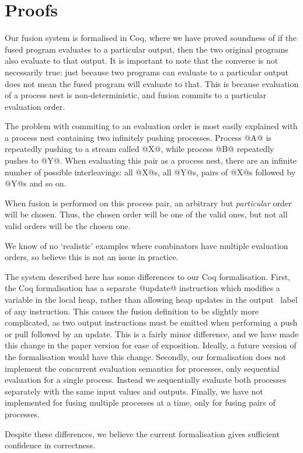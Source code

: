 
\section{Proofs}
\label{s:Proofs}

Our fusion system is formalised in Coq, where we have proved soundness of  if the fused program evaluates to a particular output, then the two original programs also evaluate to that output.
It is important to note that the converse is not necessarily true: just because two programs can evaluate to a particular output does not mean the fused program will evaluate to that.
This is because evaluation of a process nest is non-deterministic, and fusion commits to a particular evaluation order.

The problem with commiting to an evaluation order is most easily explained with a process nest containing two infinitely pushing processes.
Process @A@ is repeatedly pushing to a stream called @X@, while process @B@ repeatedly pushes to @Y@.
When evaluating this pair as a process nest, there are an infinite number of possible interleavings: all @X@s, all @Y@s, pairs of @X@s followed by @Y@s and so on.

When fusion is performed on this process pair, an arbitrary but \emph{particular} order will be chosen.
Thus, the chosen order will be one of the valid ones, but not all valid orders will be the chosen one.

We know of no `realistic' examples where combinators have multiple evaluation orders, so believe this is not an issue in practice.

The system described here has some differences to our Coq formalisation.
First, the Coq formalisation has a separate @update@ instruction which modifies a variable in the local heap, rather than allowing heap updates in the output \Goto~label of any instruction.
This causes the fusion definition to be slightly more complicated, as two output instructions must be emitted when performing a push or pull followed by an update.
This is a fairly minor difference, and we have made this change in the paper version for ease of exposition.
Ideally, a future version of the formalisation would have this change.
Secondly, our formalisation does not implement the concurrent evaluation semantics for processes, only sequential evaluation for a single process.
Instead we sequentially evaluate both processes separately with the same input values and outputs.
Finally, we have not implemented  for fusing multiple processes at a time, only  for fusing pairs of processes.

Despite these differences, we believe the current formalisation gives sufficient confidence in correctness.

